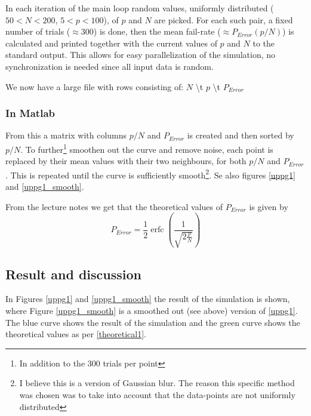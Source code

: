 \documentclass[12pt,a4paper]{article}
\begin{document}
In each iteration of the main loop random values, uniformly distributed
($50<N<200$, $5<p<100$), of $p$ and $N$ are picked.  For each such pair, a
fixed number of trials ($\approx 300$) is done, then the mean fail-rate
($\approx P_{Error}(p/N)$) is calculated and printed together with the
current values of $p$ and $N$ to the standard output. This allows for easy
parallelization of the simulation, no synchronization is needed since all
input data is random.

We now have a large file with rows consisting of: $N$ \textbackslash{}t $p$ \textbackslash{}t $P_{Error}$

\subsubsection{In Matlab} \label{inMatlab1}

From this a matrix with columns $p/N$ and $P_{Error}$ is created and then
sorted by $p/N$. To further\footnote{In addition to the 300 trials per point}
smoothen out the curve and remove noise, each point is replaced by their mean
values with their two neighbours, for both $p/N$ and $P_{Error}$. This is
repeated until the curve is sufficiently smooth\footnote{I believe this is a
version of Gaussian blur. The reason this specific method was chosen was to
take into account that the data-points are not uniformly distributed}. Se
also figures \ref{uppg1} and \ref{uppg1_smooth}.


From the lecture notes we get that the theoretical values of $P_{Error}$ is
given by
\begin{equation} \label{theoretical1}
P_{Error} = \frac{1}{2} \operatorname{erfc}(\frac{1}{\sqrt{2 \frac{p}{N}}})
\end{equation}

\subsection{Result and discussion}
In Figures \ref{uppg1} and \ref{uppg1_smooth} the result of the simulation
is shown, where Figure \ref{uppg1_smooth} is a smoothed out (see above)
version of \ref{uppg1}. The blue curve shows the result of the simulation
and the green curve shows the theoretical values as per \eqref{theoretical1}.
\end{document}
